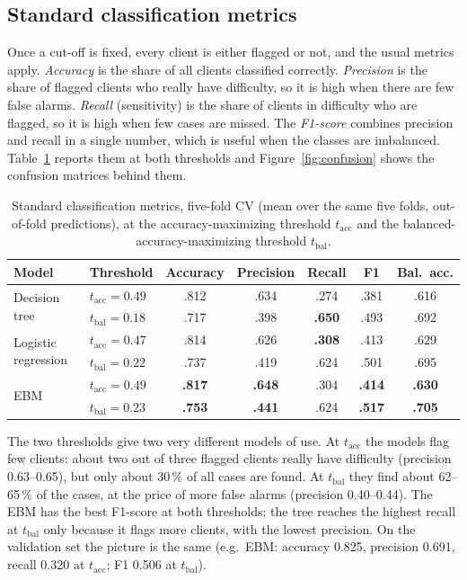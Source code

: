 \documentclass[a4paper,11pt]{article}
\begin{document}
\subsection{Standard classification metrics}
Once a cut-off is fixed, every client is either flagged or not, and the usual metrics apply. \emph{Accuracy} is the share of all clients classified correctly. \emph{Precision} is the share of flagged clients who really have difficulty, so it is high when there are few false alarms. \emph{Recall} (sensitivity) is the share of clients in difficulty who are flagged, so it is high when few cases are missed. The \emph{F1-score} combines precision and recall in a single number, which is useful when the classes are imbalanced. Table~\ref{tab:standard} reports them at both thresholds and Figure~\ref{fig:confusion} shows the confusion matrices behind them.

\begin{table}[ht]
\centering
\small
\caption{Standard classification metrics, five-fold CV (mean over the same five folds, out-of-fold predictions), at the accuracy-maximizing threshold $t_{\text{acc}}$ and the balanced-accuracy-maximizing threshold $t_{\text{bal}}$.}
\label{tab:standard}
\begin{tabular}{@{}llccccc@{}}
\toprule
Model & Threshold & Accuracy & Precision & Recall & F1 & Bal.\ acc. \\
\midrule
\multirow{2}{*}{Decision tree} & $t_{\text{acc}}=0.49$ & .812 & .634 & .274 & .381 & .616 \\
 & $t_{\text{bal}}=0.18$ & .717 & .398 & \textbf{.650} & .493 & .692 \\[0.2em]
\multirow{2}{*}{Logistic regression} & $t_{\text{acc}}=0.47$ & .814 & .626 & \textbf{.308} & .413 & .629 \\
 & $t_{\text{bal}}=0.22$ & .737 & .419 & .624 & .501 & .695 \\[0.2em]
\multirow{2}{*}{EBM} & $t_{\text{acc}}=0.49$ & \textbf{.817} & \textbf{.648} & .304 & \textbf{.414} & \textbf{.630} \\
 & $t_{\text{bal}}=0.23$ & \textbf{.753} & \textbf{.441} & .624 & \textbf{.517} & \textbf{.705} \\
\bottomrule
\end{tabular}
\end{table}

The two thresholds give two very different models of use. At $t_{\text{acc}}$ the models flag few clients: about two out of three flagged clients really have difficulty (precision 0.63--0.65), but only about 30\,\% of all cases are found. At $t_{\text{bal}}$ they find about 62--65\,\% of the cases, at the price of more false alarms (precision 0.40--0.44). The EBM has the best F1-score at both thresholds; the tree reaches the highest recall at $t_{\text{bal}}$ only because it flags more clients, with the lowest precision. On the validation set the picture is the same (e.g.\ EBM: accuracy 0.825, precision 0.691, recall 0.320 at $t_{\text{acc}}$; F1 0.506 at $t_{\text{bal}}$).
\end{document}
